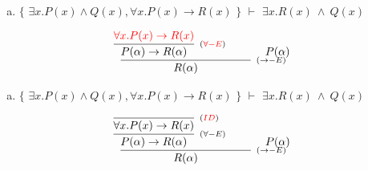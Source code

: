 \documentclass[aspectratio=43]{beamer}
\begin{document}
     \begin{frame}[fragile]
    
    	\begin{enumerate}[d)]
			\item $\{$ $\exists x.P(x)\land Q(x), \forall x.P(x)\to R(x)$ $\}$ $\vdash$ $\exists x.R(x)\ \land\ Q(x) $\\
		\end{enumerate}
        
        \vspace{70pt}
        
        \[
        \begin{array}{c}
		
        	\infer[_{(\to -E)}]
            	{R(\alpha)}
            	{\infer[_{(\textcolor{red}{\forall -E})}]
                	{P(\alpha) \rightarrow R(\alpha)} 
                    {\textcolor{red}{\forall x.P(x)\to R(x)}} 
            	\hspace{35pt}
                P(\alpha)
                }
		\end{array}
        \]
        
	\end{frame}
    
    \begin{frame}[fragile]
    
    	\begin{enumerate}[d)]
			\item $\{$ $\exists x.P(x)\land Q(x), \forall x.P(x)\to R(x)$ $\}$ $\vdash$ $\exists x.R(x)\ \land\ Q(x) $\\
		\end{enumerate}
        
        \vspace{70pt}
        
        \[
        \begin{array}{c}
		
        	\infer[_{(\to -E)}]
            	{R(\alpha)}
            	{\infer[_{(\forall -E)}]
                	{P(\alpha) \rightarrow R(\alpha)} 
                    {\infer[_{(\textcolor{red}{ID})}]
                    	{\forall x.P(x)\to R(x)}
                    	{}
                    } 
            	\hspace{35pt}
                P(\alpha)
                }
		\end{array}
        \]
        
	\end{frame}
    
\end{document}
